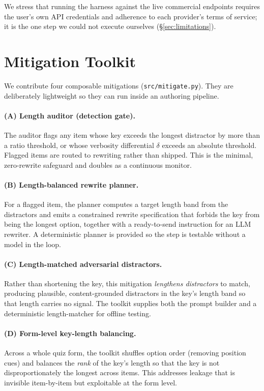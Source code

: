 \documentclass[10pt,twocolumn]{article}
\begin{document}
We stress that running the harness against the live commercial endpoints
requires the user's own API credentials and adherence to each provider's terms
of service; it is the one step we could not execute ourselves
(\S\ref{sec:limitations}).

\section{Mitigation Toolkit}
\label{sec:mitigation}

We contribute four composable mitigations (\texttt{src/mitigate.py}). They are
deliberately lightweight so they can run inside an authoring pipeline.

\paragraph{(A) Length auditor (detection gate).} The auditor flags any item
whose key exceeds the longest distractor by more than a ratio threshold, or
whose verbosity differential $\delta$ exceeds an absolute threshold. Flagged
items are routed to rewriting rather than shipped. This is the minimal,
zero-rewrite safeguard and doubles as a continuous monitor.

\paragraph{(B) Length-balanced rewrite planner.} For a flagged item, the
planner computes a target length band from the distractors and emits a
constrained rewrite specification that forbids the key from being the longest
option, together with a ready-to-send instruction for an LLM rewriter. A
deterministic planner is provided so the step is testable without a model in
the loop.

\paragraph{(C) Length-matched adversarial distractors.} Rather than shortening
the key, this mitigation \emph{lengthens distractors} to match, producing
plausible, content-grounded distractors in the key's length band so that
length carries no signal. The toolkit supplies both the prompt builder and a
deterministic length-matcher for offline testing.

\paragraph{(D) Form-level key-length balancing.} Across a whole quiz form, the
toolkit shuffles option order (removing position cues) and balances the
\emph{rank} of the key's length so that the key is not disproportionately the
longest across items. This addresses leakage that is invisible item-by-item
but exploitable at the form level.
\end{document}
